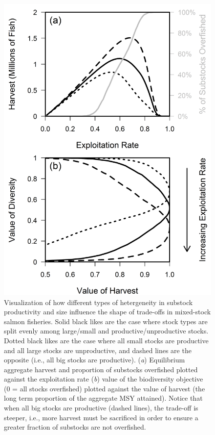 \documentclass[12pt,]{book}
\theoremstyle{definition}
\theoremstyle{definition}
\theoremstyle{definition}
\theoremstyle{remark}
\begin{document}
\begin{figure}
  \centering
  \includegraphics{img/Ch4/trade-off-plot.png}
  \caption{Visualization of how different types of hetergeneity in substock productivity and size influence the shape of trade-offs in mixed-stock salmon fisheries. Solid black likes are the case where stock types are split evenly among large/small and productive/unproductive stocks. Dotted black likes are the case where all small stocks are productive and all large stocks are unproductive, and dashed lines are the opposite (i.e., all big stocks are productive). (\textit{a}) Equilibrium aggregate harvest and proportion of substocks overfished plotted against the exploitation rate (\textit{b}) value of the biodiversity objective (0 = all stocks overfished) plotted against the value of harvest (the long term proportion of the aggregate MSY attained). Notice that when all big stocks are productive (dashed lines), the trade-off is steeper, i.e., more harvest must be sacrificed in order to ensure a greater fraction of substocks are not overfished. }
  \label{fig:trade-off-plot}
\end{figure}
\end{document}
